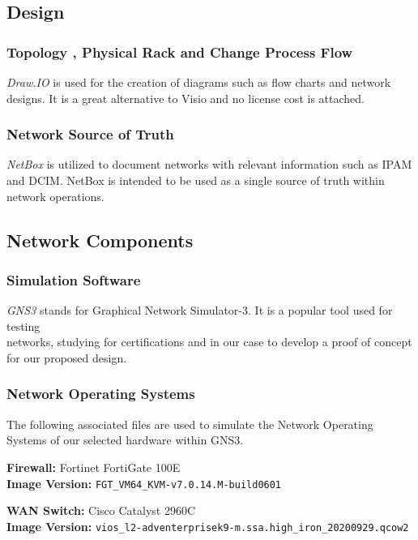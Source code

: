 \documentclass[12pt, letterpaper]{article}
\begin{document}
  
	
	
	\subsection{Design}
	
		\subsubsection{Topology , Physical Rack and Change Process Flow}
\textit{Draw.IO} is used for the creation of diagrams such as flow charts and network designs. It is a great alternative to Visio and no license cost is attached.

		\subsubsection{Network Source of Truth}
\textit{NetBox} is utilized to document networks with relevant information such as IPAM \\ and DCIM. NetBox is intended to be used as a single source of truth within network operations.
	
\newpage
	
	\subsection{Network Components}
	
		\subsubsection{Simulation Software}
\textit{GNS3} stands for Graphical Network Simulator-3. It is a popular tool used for testing \\ networks, studying for certifications and in our case to develop a proof of concept for our proposed design.
 
 
		\subsubsection{Network Operating Systems}
The following associated files are used to simulate the Network Operating Systems of
our selected hardware within GNS3.

\textbf{Firewall:} Fortinet FortiGate 100E \\
\textbf{Image Version:} \texttt{FGT\_VM64\_KVM-v7.0.14.M-build0601}

\smallskip

\textbf{WAN Switch:} Cisco Catalyst 2960C \\
\textbf{Image Version:} 
\texttt{vios\_l2-adventerprisek9-m.ssa.high\_iron\_20200929.qcow2}
\end{document}
